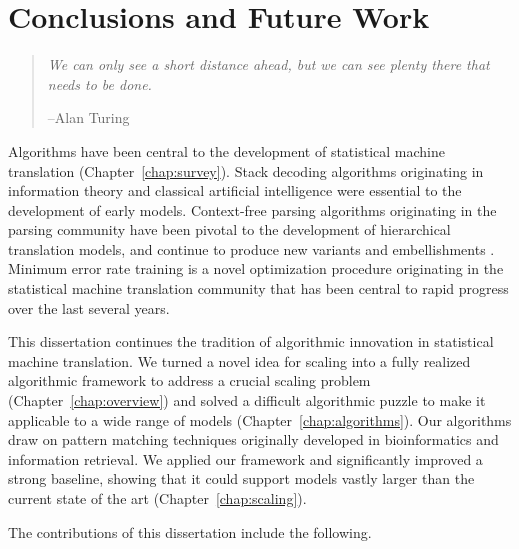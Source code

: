 \chapter{Conclusions and Future Work}\label{chap:conclusion}

\begin{quote}
	{\em We can only see a short distance ahead, but we can see plenty there that needs to be done.}
	\begin{flushright}
		--Alan Turing
	\end{flushright}
\end{quote}

Algorithms have been central to the development of statistical
machine translation (Chapter~\ref{chap:survey}).  Stack decoding algorithms \citep[e.g.,][]{Wang:1997:acl,Koehn:2004:amta} 
originating in information theory \citep{Jelinek:1969:tr} 
and classical artificial intelligence \citep{Hart:1968:ssc}
were essential to the development of 
early models.  Context-free parsing algorithms 
originating in the parsing community 
\citep{cocke:1970:book,kasami:1965:tr,younger:1967:ic,earley:1970:cacm} 
have been pivotal to the development of hierarchical
translation models, and continue to produce new variants
and embellishments \citep{Huang:2007:acl,Venugopal:2007:hlt-naacl}.  
Minimum error rate training \citep{Och:2003:acl} is a novel
optimization procedure originating in the statistical machine
translation community that has been central to rapid
progress over the last several years.

This dissertation continues the tradition of algorithmic
innovation in statistical machine translation.  We turned a
novel idea for scaling \citep{Callison-Burch:2005:acl,Zhang:2005:eamt} 
into a fully realized algorithmic framework to address a
crucial scaling problem (Chapter~\ref{chap:overview}) 
and solved a difficult algorithmic puzzle to make it applicable 
to a wide range of models (Chapter~\ref{chap:algorithms}).
Our algorithms draw on pattern matching techniques originally
developed in bioinformatics and information retrieval.
We applied our framework and significantly improved a
strong baseline, showing that it could support
models vastly larger than the current state of the art
(Chapter~\ref{chap:scaling}).

The contributions of this dissertation include the following.

